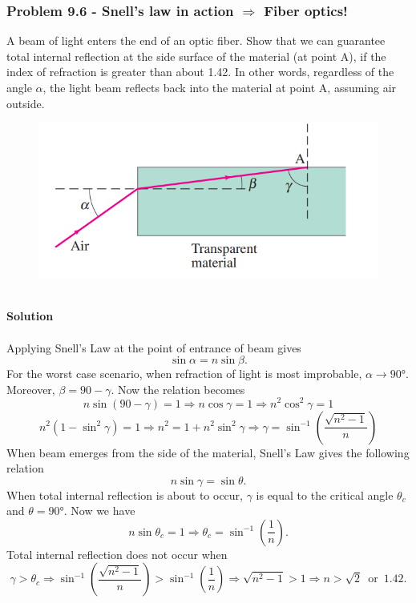 \documentclass{article}
\begin{document}
\subsubsection*{Problem 9.6 - Snell's law in action $\Rightarrow$ Fiber optics!}
A beam of light enters the end of an optic fiber. Show that we can guarantee total internal reflection at the side surface of the material (at point A), if the index of refraction is greater than about 1.42. In other words, regardless of the angle $\alpha$, the 
light beam reflects back into the material at point A, assuming air outside.
\begin{figure}[h]
    \centering
    \includegraphics[width=0.55\linewidth]{figs/fig_prob_9.6.png}
\end{figure}
\\\textbf{Solution}
\\
\\Applying Snell's Law at the point of entrance of beam gives
\[\sin\alpha=n\sin\beta.\]
For the worst case scenario, when refraction of light is most improbable, $\alpha\rightarrow90$°. Moreover, $\beta=90-\gamma$. Now the relation becomes
\[n\sin(90-\gamma)=1\Rightarrow n\cos\gamma=1\Rightarrow n^2\cos^2\gamma=1\]
\[n^2\left(1-\sin^2\gamma\right)=1\Rightarrow n^2=1+n^2\sin^2\gamma\Rightarrow\gamma=\sin^{-1}\left(\frac{\sqrt{n^2-1}}{n}\right)\]
When beam emerges from the side of the material, Snell's Law gives the following relation
\[n\sin\gamma=\sin\theta.\]
When total internal reflection is about to occur, $\gamma$ is equal to the critical angle $\theta_c$ and $\theta=90$°. Now we have
\[n\sin\theta_c=1\Rightarrow\theta_c=\sin^{-1}\left(\frac{1}{n}\right).\]
Total internal reflection does not occur when
\[\gamma>\theta_c\Rightarrow\sin^{-1}\left(\frac{\sqrt{n^2-1}}{n}\right)>\sin^{-1}\left(\frac{1}{n}\right)\Rightarrow\sqrt{n^2-1}>1\Rightarrow n>\sqrt{2}\,\,\,\text{or}\,\,\,1.42.\]
\end{document}
